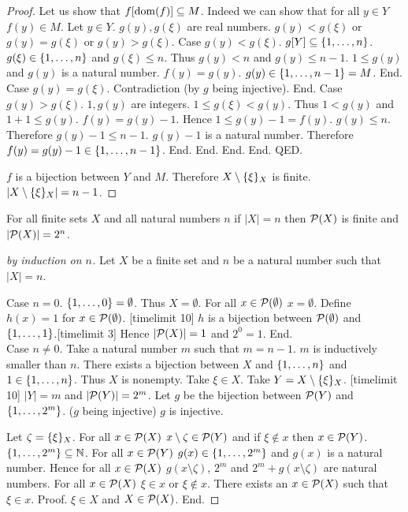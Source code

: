 \documentclass{article}
\begin{document}
\begin{forthel}
\begin{proof}
      Let us show that $f[\operatorname{dom}(f)] \subseteq M$.
      Indeed we can show that for all $y \in Y$ $f(y) \in M$.
        Let $y \in Y$.
        $g(y),g(\xi)$ are real numbers.
        $g(y) < g(\xi)$ or $g(y) = g(\xi)$ or $g(y) > g(\xi)$.
        Case $g(y) < g(\xi)$. $g[Y] \subseteq \{1,\dots,n\}$. $g(\xi) \in \{1,\dots,n\}$ and $g(\xi) \leq n$. Thus $g(y) < n$ and $g(y) \leq n-1$. 
          $1 \leq g(y)$ and $g(y)$ is a natural number.
          $f(y) = g(y)$. $g(y) \in \{1,\dots,n-1\} = M$. End.
        Case $g(y) = g(\xi)$. Contradiction (by $g$ being injective). End.
        Case $g(y) > g(\xi)$. $1,g(y)$ are integers. $1 \leq g(\xi) < g(y)$. Thus $1 < g(y)$ and $1+1 \leq g(y)$.
          $f(y) = g(y) - 1$. Hence $1 \leq g(y) - 1 = f(y)$. 
          $g(y) \leq n$. Therefore $g(y) - 1 \leq n - 1$. $g(y) - 1$ is a natural number.
          Therefore $f(y) = g(y)-1 \in \{1,\dots,n-1\}$. End.
      End.
    End.
  End.
QED.

$f$ is a bijection between $Y$ and $M$.
Therefore $X \setminus \{\xi\}_{X}$ is finite. $|X \setminus \{\xi\}_{X}| = n - 1$.
\end{proof}

\begin{theorem}
For all finite sets $X$ and all natural numbers $n$ if $|X| = n$ then
  ${\cal P}(X)$ is finite and $|{\cal P}(X)| = 2^{n}$.
\end{theorem}
\begin{proof}[by induction on $n$]
Let $X$ be a finite set and $n$ be a natural number such that $|X| = n$.

Case $n = 0$. $\{1,\dots,0\} = \emptyset$. Thus $X = \emptyset$. 
  For all $x \in {\cal P}(\emptyset)$ $x = \emptyset$. 
  Define $h(x) = 1$ for $x \in {\cal P}(\emptyset)$. 
  [timelimit 10] $h$ is a bijection between ${\cal P}(\emptyset)$ and $\{1,\dots,1\}$.[timelimit 3]
  Hence $|{\cal P}(X)| = 1$ and $2^{0} = 1$. End.\\

Case $n \neq 0$. Take a natural number $m$ such that $m = n - 1$. $m$ is inductively smaller than $n$.
  There exists a bijection between $X$ and $\{1,\dots,n\}$ and $1 \in \{1,\dots,n\}$. Thus $X$ is nonempty.
  Take $\xi \in X$. Take $Y = X \setminus \{\xi\}_{X}$.
  [timelimit 10] $|Y| = m$ and $|{\cal P}(Y)| = 2^{m}$.
  Let $g$ be the bijection between ${\cal P}(Y)$ and $\{1,\dots,2^{m}\}$. ($g$ being injective) $g$ is injective.
  
  Let $\zeta = \{\xi\}_{X}$. For all $x \in {\cal P}(X)$ $x \setminus \zeta \in {\cal P}(Y)$ and if $\xi \notin x$ then $x \in {\cal P}(Y)$. 
  $\{1,\dots,2^{m}\} \subseteq \mathbb{N}$.
  For all $x \in {\cal P}(Y)$ $g(x) \in \{1,\dots,2^{m}\}$ and $g(x)$ is a natural number.
  Hence for all $x \in {\cal P}(X)$ $g(x \setminus \zeta)$, $2^{m}$ and $2^{m} + g(x \setminus \zeta)$ are natural numbers.
  For all $x \in {\cal P}(X)$ $\xi \in x$ or $\xi \notin x$.
  There exists an $x \in {\cal P}(X)$ such that $\xi \in x$.
  Proof. $\xi \in X$ and $X \in {\cal P}(X)$. End.


\end{proof}
\end{forthel}
\end{document}
